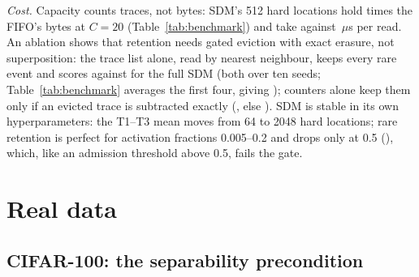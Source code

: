 \documentclass[conference]{IEEEtran}
\begin{document}
\emph{Cost.} Capacity counts traces, not bytes: SDM's 512 hard locations hold
times the FIFO's bytes at $C=20$ (Table~\ref{tab:benchmark}) and take
 against
\,$\mu$s per
read. An ablation shows that retention needs gated eviction with exact erasure,
not superposition: the trace list alone, read by nearest neighbour, keeps every
rare event and scores
against 
for the full SDM (both over ten seeds; Table~\ref{tab:benchmark} averages the
first four, giving
); counters alone keep them only if an evicted trace is
subtracted exactly
(,
else ).
SDM is stable in its own hyperparameters: the T1--T3 mean moves
from 64 to 2048 hard locations; rare retention is perfect for activation
fractions 0.005--0.2 and drops only at 0.5
(),
which, like an admission threshold above 0.5, fails the gate.

\section{Real data}
\label{sec:real}

\subsection{CIFAR-100: the separability precondition}
\end{document}
